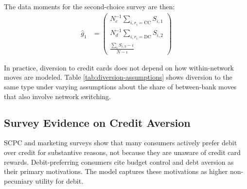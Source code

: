 \documentclass[main.tex]{subfiles}
\begin{document}
The data moments for the second-choice survey are then:
\begin{align}
\hat{g}_{1} &= \begin{pmatrix}N_{c}^{-1}\sum_{i,r_{i}=\text{CC}}S_{i,1}\\
        N_{d}^{-1}\sum_{i,r_{i}=\text{DC}}S_{i,2}\\
        \frac{\sum_{i}S_{i,3}-\iota}{N-\iota}\end{pmatrix}
\end{align}

In practice, diversion to credit cards does not depend on how within-network moves are modeled.
Table \ref{tab:diversion-assumptions} shows diversion to the same type under varying assumptions about the share of between-bank moves that also involve network switching.

\begin{table}
    \caption{Share switching to the same card type on a different network, under alternative assumptions about whether a bank switch (e.g., Chase to Bank of America) also changes the network (Visa to MC)}
    \label{tab:diversion-assumptions}
    \centering
    
\end{table}

\subsection{Survey Evidence on Credit Aversion}
\label{subsec:oa-survey-consumer-pref}

SCPC and marketing surveys show that many consumers actively prefer debit over credit for substantive reasons, not because they are unaware of credit card rewards.
Debit-preferring consumers cite budget control and debt aversion as their primary motivations.
The model captures these motivations as higher non-pecuniary utility for debit.

\begin{table}[ht!]
\small
\caption{Most important characteristic of preferred payment instrument, by payment preference}
\label{tab:survey-why}

\begin{center}  \par\end{center}
\end{table}
\end{document}
